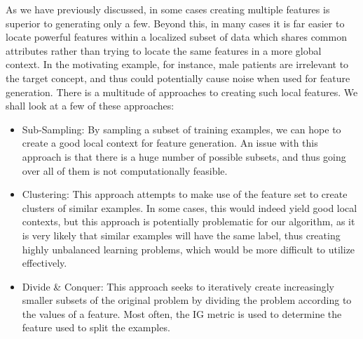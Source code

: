 \documentclass[twoside,11pt]{article}
\theoremstyle{definition}
\begin{document}
As we have previously discussed, in some cases creating multiple features is superior to generating only a few. Beyond this, in many cases it is far easier to locate powerful features within a localized subset of data which shares common attributes rather than trying to locate the same features in a more global context. In the motivating example, for instance, male patients are irrelevant to the target concept, and thus could potentially cause noise when used for feature generation.
There is a multitude of approaches to creating such local features. We shall look at a few of these approaches:
\begin{itemize}
	\item Sub-Sampling: By sampling a subset of training examples, we can hope to create a good local context for feature generation. An issue with this approach is that there is a huge number of possible subsets, and thus going over all of them is not computationally feasible. 
	\item Clustering: This approach attempts to make use of the feature set to create clusters of similar examples. In some cases, this would indeed yield good local contexts, but this approach is potentially problematic for our algorithm, as it is very likely that similar examples will have the same label, thus creating highly unbalanced learning problems, which would be more difficult to utilize effectively.
	\item Divide \& Conquer: This approach seeks to iteratively create increasingly smaller subsets of the original problem by dividing the problem according to the values of a feature. Most often, the IG metric is used to determine the feature used to split the examples.
\end{itemize}
\end{document}
